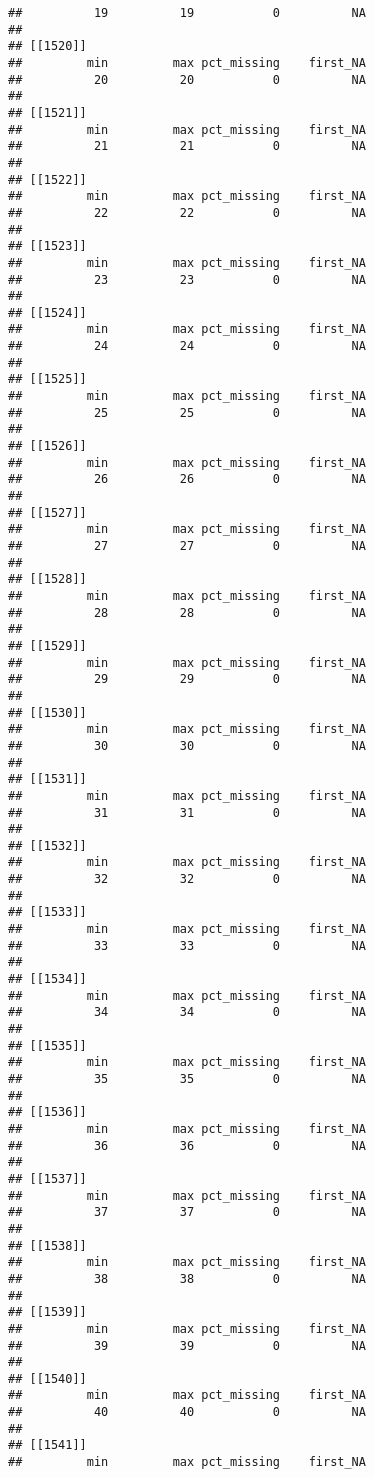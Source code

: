 \documentclass[
]{article}
\begin{document}
\begin{verbatim}
##          19          19           0          NA 
## 
## [[1520]]
##         min         max pct_missing    first_NA 
##          20          20           0          NA 
## 
## [[1521]]
##         min         max pct_missing    first_NA 
##          21          21           0          NA 
## 
## [[1522]]
##         min         max pct_missing    first_NA 
##          22          22           0          NA 
## 
## [[1523]]
##         min         max pct_missing    first_NA 
##          23          23           0          NA 
## 
## [[1524]]
##         min         max pct_missing    first_NA 
##          24          24           0          NA 
## 
## [[1525]]
##         min         max pct_missing    first_NA 
##          25          25           0          NA 
## 
## [[1526]]
##         min         max pct_missing    first_NA 
##          26          26           0          NA 
## 
## [[1527]]
##         min         max pct_missing    first_NA 
##          27          27           0          NA 
## 
## [[1528]]
##         min         max pct_missing    first_NA 
##          28          28           0          NA 
## 
## [[1529]]
##         min         max pct_missing    first_NA 
##          29          29           0          NA 
## 
## [[1530]]
##         min         max pct_missing    first_NA 
##          30          30           0          NA 
## 
## [[1531]]
##         min         max pct_missing    first_NA 
##          31          31           0          NA 
## 
## [[1532]]
##         min         max pct_missing    first_NA 
##          32          32           0          NA 
## 
## [[1533]]
##         min         max pct_missing    first_NA 
##          33          33           0          NA 
## 
## [[1534]]
##         min         max pct_missing    first_NA 
##          34          34           0          NA 
## 
## [[1535]]
##         min         max pct_missing    first_NA 
##          35          35           0          NA 
## 
## [[1536]]
##         min         max pct_missing    first_NA 
##          36          36           0          NA 
## 
## [[1537]]
##         min         max pct_missing    first_NA 
##          37          37           0          NA 
## 
## [[1538]]
##         min         max pct_missing    first_NA 
##          38          38           0          NA 
## 
## [[1539]]
##         min         max pct_missing    first_NA 
##          39          39           0          NA 
## 
## [[1540]]
##         min         max pct_missing    first_NA 
##          40          40           0          NA 
## 
## [[1541]]
##         min         max pct_missing    first_NA 

\end{verbatim}
\end{document}
